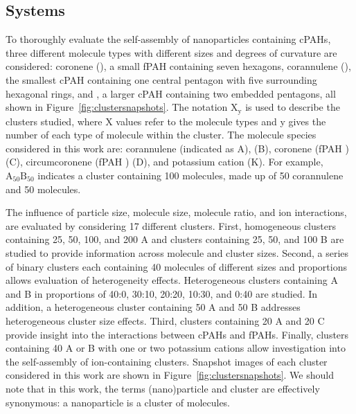 \subsection{Systems} %
To thoroughly evaluate the self-assembly of nanoparticles containing cPAHs, three different molecule types with different sizes and degrees of curvature are considered: coronene (), a small fPAH containing seven hexagons, corannulene (), the smallest cPAH containing one central pentagon with five surrounding hexagonal rings, and , a larger cPAH containing two embedded pentagons, all shown in Figure~\ref{fig:clustersnapshots}. The notation $\text{X}_{\text{y}}$ is used to describe the clusters studied, where X values refer to the molecule types and y gives the number of each type of molecule within the cluster. The molecule species considered in this work are: corannulene (indicated as A),  (B), coronene (fPAH ) (C), circumcoronene (fPAH ) (D), and potassium cation (K). For example, $\text{A}_{\text{50}}\text{B}_{\text{50}}$ indicates a cluster containing 100 molecules, made up of 50 corannulene and 50  molecules.

The influence of particle size, molecule size, molecule ratio, and ion interactions, are evaluated by considering 17 different clusters. First, homogeneous clusters containing 25, 50, 100, and 200 A and clusters containing 25, 50, and 100 B are studied to provide information across molecule and cluster sizes. 
Second, a series of binary clusters each containing 40 molecules of different sizes and proportions allows evaluation of heterogeneity effects. Heterogeneous clusters containing A and B in proportions of 40:0, 30:10, 20:20, 10:30, and 0:40 are studied. In addition, a heterogeneous cluster containing 50 A and 50 B addresses heterogeneous cluster size effects.
Third, clusters containing 20 A and 20 C provide insight into the interactions between cPAHs and fPAHs.
Finally, clusters containing 40 A or B with one or two potassium cations allow investigation into the self-assembly of ion-containing clusters.
Snapshot images of each cluster considered in this work are shown in Figure~\ref{fig:clustersnapshots}. We should note that in this work, the terms (nano)particle and cluster are effectively synonymous: a nanoparticle is a cluster of molecules.

